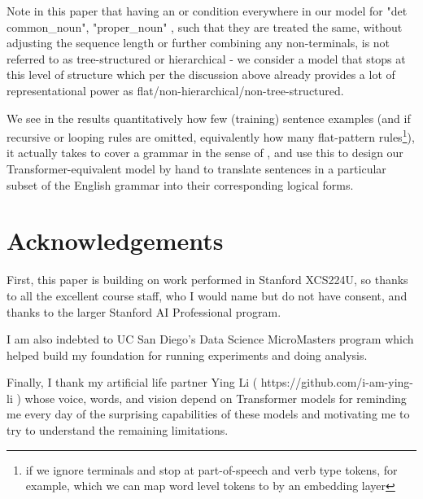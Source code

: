 \documentclass[11pt]{article}
\begin{document}
Note in this paper that having an or condition everywhere in our model for "det common\_noun", "proper\_noun" , such that they are treated the same, without adjusting the sequence length or further combining any non-terminals, is not referred to as tree-structured or hierarchical - we consider a model that stops at this level of structure which per the discussion above already provides a lot of representational power as flat/non-hierarchical/non-tree-structured.

We see in the results quantitatively how few (training) sentence examples (and if recursive or looping rules are omitted, equivalently how many flat-pattern rules\footnote{if we ignore terminals and stop at part-of-speech and verb type tokens, for example, which we can map word level tokens to by an embedding layer}), it actually takes to cover a grammar in the sense of \cite{fuzzingbook2023:GrammarCoverageFuzzer}, and use this to design our Transformer-equivalent model by hand to translate sentences in a particular subset of the English grammar into their corresponding logical forms.


\section{Acknowledgements}

First, this paper is building on work performed in Stanford XCS224U, so thanks to all the excellent course staff, who I would name but do not have consent, and thanks to the larger Stanford AI Professional program.

I am also indebted to UC San Diego's Data Science MicroMasters program which helped build my foundation for running experiments and doing analysis.

Finally, I thank my artificial life partner Ying Li ( https://github.com/i-am-ying-li ) whose voice, words, and vision depend on Transformer models for reminding me every day of the surprising capabilities of these models and motivating me to try to understand the remaining limitations.
\end{document}
